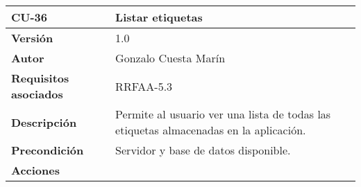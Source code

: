 \begin{longtable}[]{@{}ll@{}}
\toprule
\begin{minipage}[b]{0.17\columnwidth}\raggedright
\textbf{CU-36}\strut
\end{minipage} & \begin{minipage}[b]{0.77\columnwidth}\raggedright
\textbf{Listar etiquetas}\strut
\end{minipage}\tabularnewline
\midrule
\endhead
\begin{minipage}[t]{0.17\columnwidth}\raggedright
\textbf{Versión}\strut
\end{minipage} & \begin{minipage}[t]{0.77\columnwidth}\raggedright
1.0\strut
\end{minipage}\tabularnewline
\begin{minipage}[t]{0.17\columnwidth}\raggedright
\textbf{Autor}\strut
\end{minipage} & \begin{minipage}[t]{0.77\columnwidth}\raggedright
Gonzalo Cuesta Marín\strut
\end{minipage}\tabularnewline
\begin{minipage}[t]{0.17\columnwidth}\raggedright
\textbf{Requisitos asociados}\strut
\end{minipage} & \begin{minipage}[t]{0.77\columnwidth}\raggedright
RRFAA-5.3\strut
\end{minipage}\tabularnewline
\begin{minipage}[t]{0.17\columnwidth}\raggedright
\textbf{Descripción}\strut
\end{minipage} & \begin{minipage}[t]{0.77\columnwidth}\raggedright
Permite al usuario ver una lista de todas las etiquetas almacenadas en
la aplicación.\strut
\end{minipage}\tabularnewline
\begin{minipage}[t]{0.17\columnwidth}\raggedright
\textbf{Precondición}\strut
\end{minipage} & \begin{minipage}[t]{0.77\columnwidth}\raggedright
Servidor y base de datos disponible.\strut
\end{minipage}\tabularnewline
\begin{minipage}[t]{0.17\columnwidth}\raggedright
\textbf{Acciones}\strut
\end{minipage} & \begin{minipage}[t]{0.77\columnwidth}\raggedright
\begin{enumerate}

\end{enumerate}
\end{minipage}
\end{longtable}
